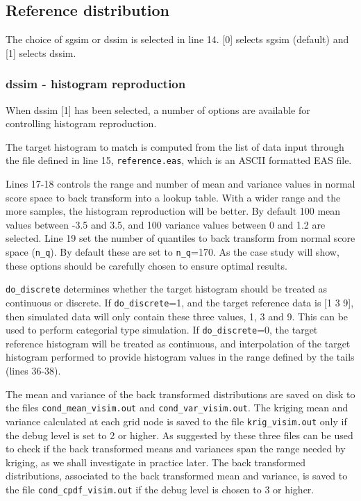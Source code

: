 \documentclass[12t]{article}
\begin{document}
\subsection{Reference distribution}
The choice of sgsim or dssim is selected in line 14.
[0] selects sgsim (default) and [1] selects dssim.


\subsubsection{dssim - histogram reproduction}
When dssim [1] has been selected, a number of options are available for controlling histogram reproduction.

The target histogram to match is computed from the list of data input through the file defined in line 15, \texttt{reference.eas}, which is an ASCII formatted EAS file.

Lines 17-18 controls the range and number of mean and variance values
in normal score space to back transform into a lookup table. With a
wider range and the more samples, the histogram reproduction will be
better.
By default 100 mean values between -3.5 and 3.5, and 100 variance
values between 0 and 1.2 are selected.
Line 19 set the number of quantiles to back transform from normal
score space (\texttt{n\_q}).
By default these are set to  \texttt{n\_q}=170.
As the case study will show, these options should be carefully chosen to ensure optimal results.

\texttt{do\_discrete} determines whether the target histogram should be treated as continuous or discrete. If \texttt{do\_discrete}=1, and the target reference data is [1 3 9], then simulated data will only contain these three values, 1, 3 and 9. This can be used to perform categorial type simulation. If \texttt{do\_discrete}=0, the target reference histogram will be treated as continuous, and interpolation of the target histogram performed to provide histogram values in the range defined by the tails (lines 36-38).

The mean and variance of the back transformed distributions are saved
on disk to the files \texttt{cond\_mean\_visim.out} and 
\texttt{cond\_var\_visim.out}.
The kriging mean and variance calculated at each grid node is
saved to the file 
\texttt{krig\_visim.out} only if the debug level is set to 2 or higher.
As suggested by \cite{Deutsch:2000:DSSIM-HR} these three files can be used to check if the back transformed
means and variances span the range needed by kriging, as we shall
investigate in practice later.
The back transformed distributions, associated to the back transformed
mean and variance, is saved to the file 
\texttt{cond\_cpdf\_visim.out}
if the debug level is chosen to 3 or higher.
\end{document}

